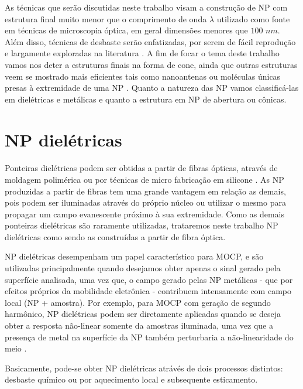 As técnicas que serão discutidas neste trabalho visam a construção de NP com estrutura final muito menor que o comprimento de onda $\lambda$ utilizado como fonte em técnicas de microscopia óptica, em geral dimensões menores que $ 100\,\, nm $. Além disso, técnicas de desbaste serão enfatizadas, por serem de fácil reprodução e largamente exploradas na literatura \cite{picardi,boyle,klein,muller}. A fim de focar o tema deste trabalho vamos nos deter a estruturas finais na forma de cone, ainda que outras estruturas veem se mostrado mais eficientes tais como nanoantenas ou moléculas únicas presas à extremidade de uma NP \cite{principle,novotny}. Quanto a natureza das NP vamos classificá-las em dielétricas e metálicas e quanto a estrutura em NP de abertura ou cônicas.

\section{NP dielétricas}
\paragraph*{}
Ponteiras dielétricas podem ser obtidas a partir de fibras ópticas, através de moldagem polimérica ou por técnicas de micro fabricação em silicone \cite{principle}. As NP produzidas a partir de fibras tem uma grande vantagem em relação as demais, pois podem ser iluminadas através do próprio núcleo ou utilizar o mesmo para propagar um campo evanescente próximo à sua extremidade. Como as demais ponteiras dielétricas são raramente utilizadas, trataremos neste trabalho NP dielétricas como sendo as construídas a partir de fibra óptica.

NP dielétricas desempenham um papel característico para MOCP, e são utilizadas principalmente quando desejamos obter apenas o sinal gerado pela superfície analisada, uma vez que, o campo gerado pelas NP metálicas - que por efeitos próprios da mobilidade eletrônica - contribuem intensamente com campo local (NP + amostra). Por exemplo, para MOCP com geração de segundo harmônico, NP dielétricas podem ser diretamente aplicadas quando se deseja obter a resposta não-linear somente da amostras iluminada, uma vez que a presença de metal na superfície da NP também perturbaria a não-linearidade do meio \cite{zayats,malkmus}. 

Basicamente, pode-se obter NP dielétricas atrávés de dois processos distintos: desbaste químico ou por aquecimento local e subsequente esticamento. 

